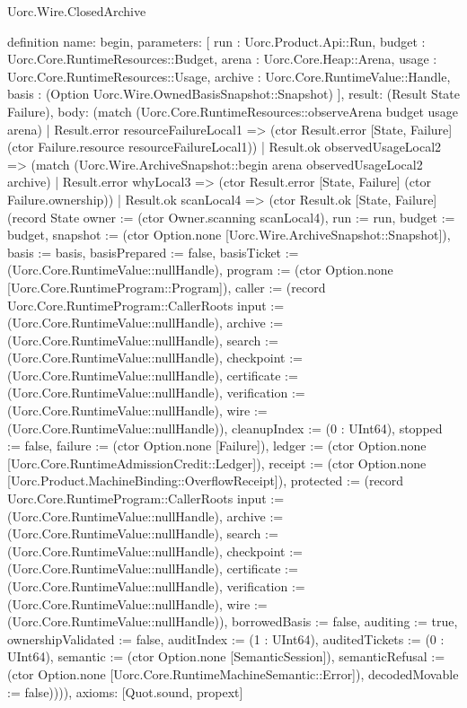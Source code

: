 \begin{lexlean}{Uorc.Wire.ClosedArchive}
\begin{semanticmodule}
definition{
  name: begin,
  parameters: [
    run : Uorc.Product.Api::Run,
    budget : Uorc.Core.RuntimeResources::Budget,
    arena : Uorc.Core.Heap::Arena,
    usage : Uorc.Core.RuntimeResources::Usage,
    archive : Uorc.Core.RuntimeValue::Handle,
    basis : (Option Uorc.Wire.OwnedBasisSnapshot::Snapshot)
  ],
  result: (Result State Failure),
  body: (match (Uorc.Core.RuntimeResources::observeArena budget usage arena)
    | Result.error resourceFailureLocal1 => (ctor Result.error [State, Failure] (ctor Failure.resource resourceFailureLocal1))
    | Result.ok observedUsageLocal2 => (match (Uorc.Wire.ArchiveSnapshot::begin arena observedUsageLocal2 archive)
      | Result.error whyLocal3 => (ctor Result.error [State, Failure] (ctor Failure.ownership))
      | Result.ok scanLocal4 => (ctor Result.ok [State, Failure] (record State {owner := (ctor Owner.scanning scanLocal4), run := run, budget := budget, snapshot := (ctor Option.none [Uorc.Wire.ArchiveSnapshot::Snapshot]), basis := basis, basisPrepared := false, basisTicket := (Uorc.Core.RuntimeValue::nullHandle), program := (ctor Option.none [Uorc.Core.RuntimeProgram::Program]), caller := (record Uorc.Core.RuntimeProgram::CallerRoots {input := (Uorc.Core.RuntimeValue::nullHandle), archive := (Uorc.Core.RuntimeValue::nullHandle), search := (Uorc.Core.RuntimeValue::nullHandle), checkpoint := (Uorc.Core.RuntimeValue::nullHandle), certificate := (Uorc.Core.RuntimeValue::nullHandle), verification := (Uorc.Core.RuntimeValue::nullHandle), wire := (Uorc.Core.RuntimeValue::nullHandle)}), cleanupIndex := (0 : UInt64), stopped := false, failure := (ctor Option.none [Failure]), ledger := (ctor Option.none [Uorc.Core.RuntimeAdmissionCredit::Ledger]), receipt := (ctor Option.none [Uorc.Product.MachineBinding::OverflowReceipt]), protected := (record Uorc.Core.RuntimeProgram::CallerRoots {input := (Uorc.Core.RuntimeValue::nullHandle), archive := (Uorc.Core.RuntimeValue::nullHandle), search := (Uorc.Core.RuntimeValue::nullHandle), checkpoint := (Uorc.Core.RuntimeValue::nullHandle), certificate := (Uorc.Core.RuntimeValue::nullHandle), verification := (Uorc.Core.RuntimeValue::nullHandle), wire := (Uorc.Core.RuntimeValue::nullHandle)}), borrowedBasis := false, auditing := true, ownershipValidated := false, auditIndex := (1 : UInt64), auditedTickets := (0 : UInt64), semantic := (ctor Option.none [SemanticSession]), semanticRefusal := (ctor Option.none [Uorc.Core.RuntimeMachineSemantic::Error]), decodedMovable := false})))),
  axioms: [Quot.sound, propext]
}


\end{semanticmodule}
\end{lexlean}
